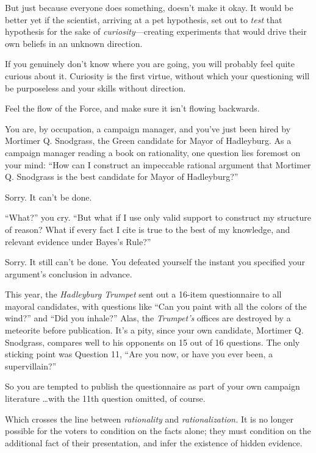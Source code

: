 {
 But just because everyone does something, doesn't
make it okay. It would be better yet if the scientist, arriving at a
pet hypothesis, set out to \textit{test} that hypothesis for the sake
of \textit{curiosity}{}---creating experiments that would drive their
own beliefs in an unknown direction.}

{
 If you genuinely don't know where you are going,
you will probably feel quite curious about it. Curiosity is the first
virtue, without which your questioning will be purposeless and your
skills without direction.}

{
 Feel the flow of the Force, and make sure it isn't
flowing backwards.}

\myendsectiontext


{
 You are, by occupation, a campaign manager, and
you've just been hired by Mortimer Q. Snodgrass, the
Green candidate for Mayor of Hadleyburg. As a campaign manager reading
a book on rationality, one question lies foremost on your mind:
``How can I construct an impeccable rational argument
that Mortimer Q. Snodgrass is the best candidate for Mayor of
Hadleyburg?'' }

{
 Sorry. It can't be done.}

{
 ``What?'' you cry.
``But what if I use only valid support to construct my
structure of reason? What if every fact I cite is true to the best of
my knowledge, and relevant evidence under Bayes's
Rule?''}

{
 Sorry. It still can't be done. You defeated
yourself the instant you specified your argument's
conclusion in advance.}

{
 This year, the \textit{Hadleyburg Trumpet} sent out a 16-item
questionnaire to all mayoral candidates, with questions like
``Can you paint with all the colors of the
wind?'' and ``Did you
inhale?'' Alas, the
\textit{Trumpet's} offices are destroyed by a meteorite
before publication. It's a pity, since your own
candidate, Mortimer Q. Snodgrass, compares well to his opponents on 15
out of 16 questions. The only sticking point was Question 11,
``Are you now, or have you ever been, a
supervillain?''}

{
 So you are tempted to publish the questionnaire as part of your
own campaign literature \ldots with the 11th question omitted, of
course.}

{
 Which crosses the line between \textit{rationality} and
\textit{rationalization.} It is no longer possible for the voters to
condition on the facts alone; they must condition on the additional
fact of their presentation, and infer the existence of hidden
evidence.}


